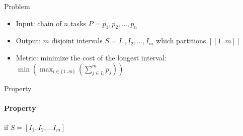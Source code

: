 \documentclass[landscape]{slides}
\begin{document}
\begin{slide}
	\Large{Problem}
	\begin{itemize}
    \item Input: chain of $n$ tasks $P = p_1, p_2, ..., p_n$
    \item Output: $m$ disjoint intervals  $S = I_1, I_2, ..., I_m$ which
    			partitions $[[1..m]]$
    \item Metric: minimize the cost of the longest interval:
    			$\min(\max_{i\in\{1..m\}}(\sum_{j \in{I_i}}^m p_j))$
	\end{itemize}
\end{slide}

\begin{slide}
	\Large{Property}
	\paragraph{Property}
	if $S = [I_1, I_2, ... I_m]$
\end{slide}
\end{document}
